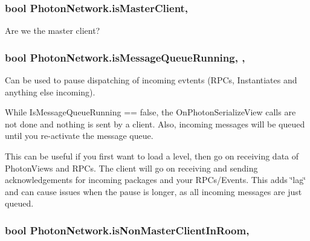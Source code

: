 \subsubsection[{\texorpdfstring{is\+Master\+Client}{isMasterClient}}]{\setlength{\rightskip}{0pt plus 5cm}bool Photon\+Network.\+is\+Master\+Client\hspace{0.3cm}{\ttfamily [static]}, {\ttfamily [get]}}\hypertarget{class_photon_network_af498064a6019a6c69e875bd64db40216}{}\label{class_photon_network_af498064a6019a6c69e875bd64db40216}


Are we the master client? 

\subsubsection[{\texorpdfstring{is\+Message\+Queue\+Running}{isMessageQueueRunning}}]{\setlength{\rightskip}{0pt plus 5cm}bool Photon\+Network.\+is\+Message\+Queue\+Running\hspace{0.3cm}{\ttfamily [static]}, {\ttfamily [get]}, {\ttfamily [set]}}\hypertarget{class_photon_network_a9cf8214080471001a1a32e17eff9b402}{}\label{class_photon_network_a9cf8214080471001a1a32e17eff9b402}


Can be used to pause dispatching of incoming evtents (R\+P\+Cs, Instantiates and anything else incoming). 

While Is\+Message\+Queue\+Running == false, the On\+Photon\+Serialize\+View calls are not done and nothing is sent by a client. Also, incoming messages will be queued until you re-\/activate the message queue.

This can be useful if you first want to load a level, then go on receiving data of Photon\+Views and R\+P\+Cs. The client will go on receiving and sending acknowledgements for incoming packages and your R\+P\+Cs/\+Events. This adds \char`\"{}lag\char`\"{} and can cause issues when the pause is longer, as all incoming messages are just queued. 
\subsubsection[{\texorpdfstring{is\+Non\+Master\+Client\+In\+Room}{isNonMasterClientInRoom}}]{\setlength{\rightskip}{0pt plus 5cm}bool Photon\+Network.\+is\+Non\+Master\+Client\+In\+Room\hspace{0.3cm}{\ttfamily [static]}, {\ttfamily [get]}}\hypertarget{class_photon_network_afbff4452088b29acf41bf3012a8d2545}{}\label{class_photon_network_afbff4452088b29acf41bf3012a8d2545}


